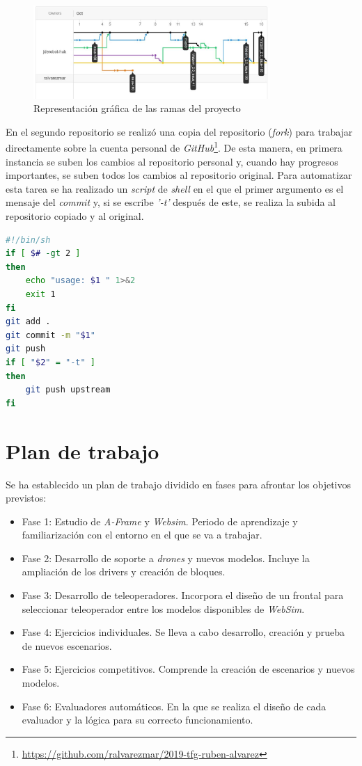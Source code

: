  \begin{figure}[H]
    \centering
    \includegraphics[width=0.8\textwidth]{img/github.jpg}
    \caption{Representación gráfica de las ramas del proyecto} \label{fig:github}
\end{figure}

En el segundo repositorio se realizó una copia del repositorio (\textit{fork}) para trabajar directamente sobre la cuenta personal de \textit{GitHub}\footnote{\url{https://github.com/ralvarezmar/2019-tfg-ruben-alvarez}}. De esta manera, en primera instancia se suben los cambios al repositorio personal y, cuando hay progresos importantes, se suben todos los cambios al repositorio original. Para automatizar esta tarea se ha realizado un \textit{script} de \textit{shell} en el que el primer argumento es el mensaje del \textit{commit} y, si se escribe \textit{'-t'} después de este, se realiza la subida al repositorio copiado y al original.

\begin{lstlisting}[language=bash, caption=\textit{Script} para subir código a \textit{GitHub}]
#!/bin/sh
if [ $# -gt 2 ]
then
	echo "usage: $1 " 1>&2
	exit 1
fi
git add .
git commit -m "$1"
git push
if [ "$2" = "-t" ]
then
	git push upstream
fi
\end{lstlisting}

\section{Plan de trabajo}
\label{sec:plan}

Se ha establecido un plan de trabajo dividido en fases para afrontar los objetivos previstos: 
\begin{itemize}
    \item Fase 1: Estudio de \textit{A-Frame} y \textit{Websim}. Periodo de aprendizaje y familiarización con el entorno en el que se va a trabajar. 
    \item Fase 2: Desarrollo de soporte a \textit{drones} y nuevos modelos. Incluye la ampliación de los drivers y creación de bloques.
    \item Fase 3: Desarrollo de teleoperadores. Incorpora el diseño de un frontal para seleccionar teleoperador entre los modelos disponibles de \textit{WebSim}.
    \item Fase 4: Ejercicios individuales. Se lleva a cabo desarrollo, creación y prueba de nuevos escenarios. 
    \item Fase 5: Ejercicios competitivos. Comprende la creación de escenarios y nuevos modelos. 
    \item Fase 6: Evaluadores automáticos. En la que se realiza el diseño de cada evaluador y la lógica para su correcto funcionamiento.
\end{itemize}